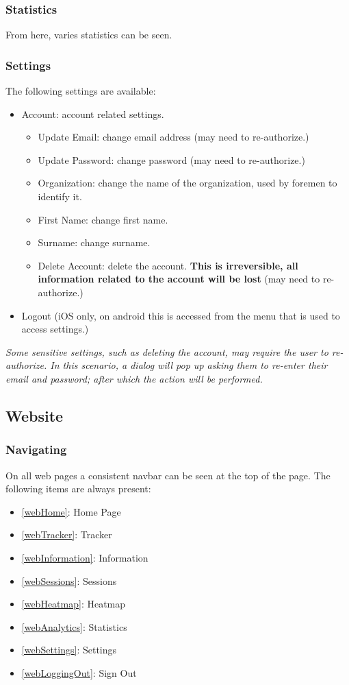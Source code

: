 \documentclass[11pt]{article}
\begin{document}
\subsubsection{Statistics}
\label{Mobile Statistics}

From here, varies statistics can be seen.

\subsubsection{Settings}
\label{Mobile Settings}

The following settings are available:
\begin{itemize}
 \item Account: account related settings.
 \begin{itemize}
  \item Update Email: change email address (may need to re-authorize.)
  \item Update Password: change password (may need to re-authorize.)
  \item Organization: change the name of the organization, used by foremen to identify it.
  \item First Name: change first name.
  \item Surname: change surname.
  \item Delete Account: delete the account. \textbf{This is irreversible, all information related to the account will be lost} (may need to re-authorize.)
 \end{itemize}
 \item Logout (iOS only, on android this is accessed from the menu that is used to access settings.)
\end{itemize}
\textit{Some sensitive settings, such as deleting the account, may require the user to re-authorize. In this scenario, a dialog will pop up asking them to re-enter their email and password; after which the action will be performed.}

\subsection{Website}
\subsubsection{Navigating}
\label{webNavigating}
On all web pages a consistent navbar can be seen at the top of the page. The following items are always present:
\begin{itemize}
 \item \ref{webHome}: Home Page
 \item \ref{webTracker}: Tracker
 \item \ref{webInformation}: Information
 \item \ref{webSessions}: Sessions
 \item \ref{webHeatmap}: Heatmap
 \item \ref{webAnalytics}: Statistics
 \item \ref{webSettings}: Settings
 \item \ref{webLoggingOut}: Sign Out
\end{itemize}
\end{document}

